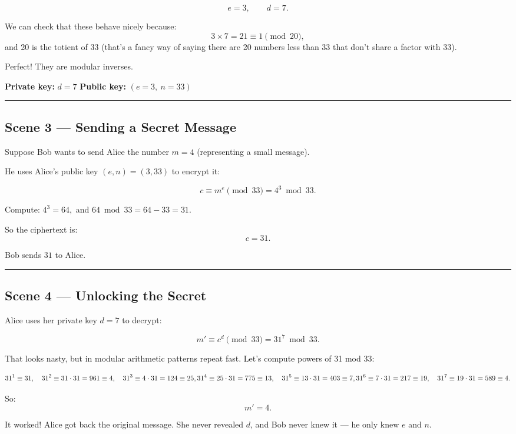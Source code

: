 \documentclass[12pt]{article}
\begin{document}
\[
e = 3, \qquad d = 7.
\]

We can check that these behave nicely because:
\[
3\times 7 = 21 \equiv 1 \pmod{20},
\]
and 20 is the totient of 33 (that’s a fancy way of saying there are 20 numbers less than 33 that don’t share a factor with 33).

Perfect! They are modular inverses.

\textbf{Private key:} $d=7$  
\textbf{Public key:} $(e=3,\ n=33)$

\bigskip
\hrule
\vspace{0.5em}

\subsection*{Scene 3 — Sending a Secret Message}

Suppose Bob wants to send Alice the number $m=4$ (representing a small message).

He uses Alice’s public key $(e,n)=(3,33)$ to encrypt it:

\[
c \equiv m^e \pmod{33} = 4^3 \bmod 33.
\]

Compute:  
$4^3 = 64,$ and $64 \bmod 33 = 64 - 33 = 31.$

So the ciphertext is:
\[
c = 31.
\]

Bob sends $31$ to Alice.

\bigskip
\hrule
\vspace{0.5em}

\subsection*{Scene 4 — Unlocking the Secret}

Alice uses her private key $d=7$ to decrypt:

\[
m' \equiv c^d \pmod{33} = 31^7 \bmod 33.
\]

That looks nasty, but in modular arithmetic patterns repeat fast.  
Let’s compute powers of 31 mod 33:

\[
31^1 \equiv 31, \quad
31^2 \equiv 31\cdot31 = 961 \equiv 4, \quad
31^3 \equiv 4\cdot31 = 124 \equiv 25,\\
31^4 \equiv 25\cdot31 = 775 \equiv 13, \quad
31^5 \equiv 13\cdot31 = 403 \equiv 7,\\
31^6 \equiv 7\cdot31 = 217 \equiv 19, \quad
31^7 \equiv 19\cdot31 = 589 \equiv 4.
\]

So:
\[
m' = 4.
\]

It worked! Alice got back the original message.  
She never revealed $d$, and Bob never knew it — he only knew $e$ and $n$.
\end{document}
